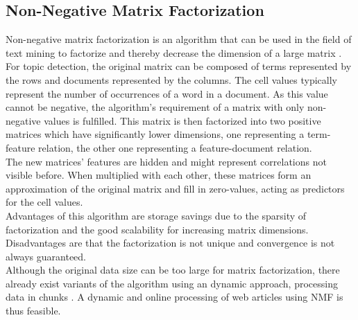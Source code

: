 \subsection{Non-Negative Matrix Factorization}\label{sec:NMF}

Non-negative matrix factorization is an algorithm that can be used in the field of text mining to factorize and thereby decrease the dimension of a large matrix \cite{Lee}. For topic detection, the original matrix can be composed of terms represented by the rows and documents represented by the columns. The cell values typically represent the number of occurrences of a word in a document. As this value cannot be negative, the algorithm's requirement of a matrix with only non-negative values is fulfilled. This matrix is then factorized into two positive matrices which have significantly lower dimensions, one representing a term-feature relation, the other one representing a feature-document relation. \\
The new matrices' features are hidden and might represent correlations not visible before. When multiplied with each other, these matrices form an approximation of the original matrix and fill in zero-values, acting as predictors for the cell values.\\

Advantages of this algorithm are storage savings due to the sparsity of factorization and the good scalability for increasing matrix dimensions. Disadvantages are that the factorization is not unique and convergence is not always guaranteed.\\
Although the original data size can be too large for matrix factorization, there already exist variants of the algorithm using an dynamic approach, processing data in chunks \cite{NMFOnline}. A dynamic and online processing of web articles using NMF is thus feasible.

